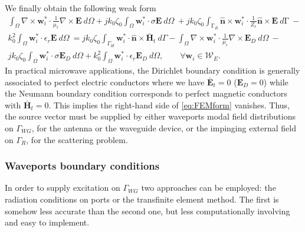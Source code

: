 \noindent We finally obtain the following weak form
\begin{multline}
\label{eq:FEMform}
\int_\Omega \nabla \times \mathbf{w}_i^* \cdot \frac{1}{\mu_r} \nabla \times \mathbf{E} \ d\Omega +
 j k_0 \zeta_0 \int_\Omega \mathbf{w}_i^* \cdot \sigma \mathbf{E} \ d\Omega \ + 
 j k_0 \zeta_0 \int_{\mathrm{\Gamma}_R} \hat{\mathbf{n}} \times \mathbf{w}_i^* \cdot \frac{1}{Z_s} \hat{\mathbf{n}} \times \mathbf{E} \ d\mathrm{\Gamma} \ - \\
 k_0^2 \int_\Omega \mathbf{w}_i^* \cdot \epsilon_r \mathbf{E} \ d\Omega \ = 
 j k_0 \zeta_0 \int_{\Gamma_{H}} \mathbf{w}_i^* \cdot \hat{\mathbf{n}} \times \bar{\mathbf{H}}_t \ d\Gamma - 
\int_\Omega \nabla \times \mathbf{w}_i^* \cdot \frac{1}{\mu_r} \nabla \times \mathbf{E}_D \ d\Omega \ - \\
j k_0 \zeta_0 \int_\Omega \mathbf{w}_i^* \cdot \sigma \mathbf{E}_D \ d\Omega +
 k_0^2 \int_\Omega \mathbf{w}_i^* \cdot \epsilon_r \mathbf{E}_D \ d\Omega, 
\qquad \forall \mathbf{w}_i \in \mathcal{W}_E.
\end{multline}
\noindent In practical microwave applications, the Dirichlet boundary condition is generally associated to perfect electric conductors where we have $\bar{\mathbf{E}}_t = 0$ ($\mathbf{E}_D = 0$) while the Neumann boundary condition corresponds to perfect magnetic conductors with $\bar{\mathbf{H}}_t = 0$. This implies the right-hand side of \eqref{eq:FEMform} vanishes. Thus, the source vector must be supplied by either waveports modal field distributions on $\Gamma_{WG}$, for the antenna or the waveguide device, or the impinging external field on $\Gamma_R$, for the scattering problem.

\subsubsection{Waveports boundary conditions}

In order to supply excitation on $\Gamma_{WG}$ two approaches can be employed: the radiation conditions on ports or the transfinite element method. The first is somehow less accurate than the second one, but less computationally involving and easy to implement.


